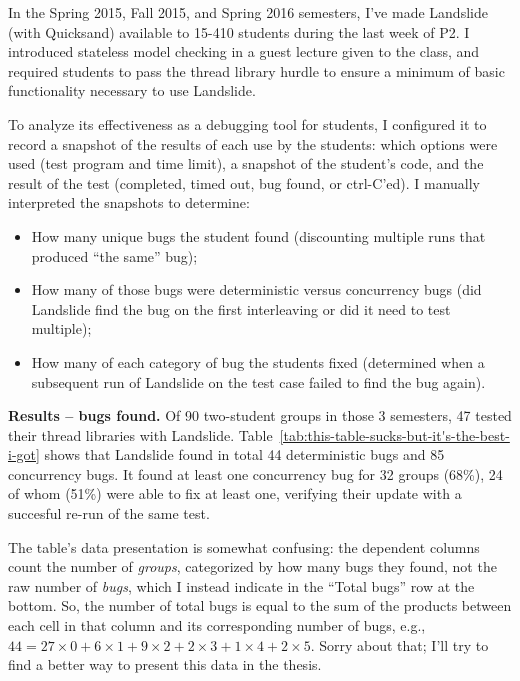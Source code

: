 In the Spring 2015, Fall 2015, and Spring 2016 semesters,
I've made Landslide (with Quicksand) available to 15-410 students during the last week of P2.
I introduced stateless model checking in a guest lecture given to the class,
and required students to pass the thread library hurdle \cite{thrlib}
to ensure a minimum of basic functionality necessary to use Landslide.

To analyze its effectiveness as a debugging tool for students,
I configured it to record a snapshot of the results of each use by the students:
which options were used (test program and time limit),
a snapshot of the student's code, and the result of the test
(completed, timed out, bug found, or ctrl-C'ed).
I manually interpreted the snapshots to determine:
\begin{itemize}
	\item How many unique bugs the student found (discounting multiple runs that produced ``the same'' bug);
	\item How many of those bugs were deterministic versus concurrency bugs (did Landslide find the bug on the first interleaving or did it need to test multiple);
	\item How many of each category of bug the students fixed (determined when a subsequent run of Landslide on the test case failed to find the bug again).
\end{itemize}

{\bf Results -- bugs found.}
Of 90 two-student groups in those 3 semesters, 47 tested their thread libraries with Landslide.
Table~\ref{tab:this-table-sucks-but-it's-the-best-i-got} shows
that Landslide found in total 44 deterministic bugs and 85 concurrency bugs.
It found at least one concurrency bug for 32 groups (68\%),
24 of whom (51\%) were able to fix at least one, verifying their update
with a succesful re-run of the same test.

The table's data presentation is somewhat confusing:
the dependent columns count the number of {\em groups}, categorized by how many bugs they found, not the raw number of {\em bugs},
which I instead indicate in the ``Total bugs'' row at the bottom.
So, the number of total bugs is equal to the sum of the products between each cell in that column and its corresponding number of bugs,
e.g., $44 = 27\times0 + 6\times1 + 9\times2 + 2\times3 + 1\times4 + 2\times5$.
Sorry about that; I'll try to find a better way to present this data in the thesis.

